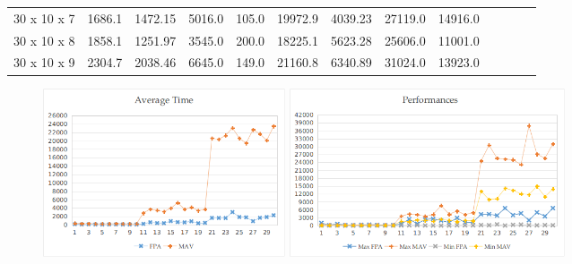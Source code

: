 \documentclass{article}
\begin{document}
\begin{table}[]
\begin{tabular}{ccccccccccccc}
	    		30     x 10   x 7   & 1686.1                       & 1472.15         & 5016.0                   & 105.0                    & 19972.9                      & 4039.23            & 27119.0                  & 14916.0                  \\
	    		30     x 10   x 8   & 1858.1                       & 1251.97           & 3545.0                   & 200.0                    & 18225.1                      & 5623.28            & 25606.0                  & 11001.0                  \\
	    		30     x 10   x 9   & 2304.7                       & 2038.46           & 6645.0                   & 149.0                    & 21160.8                      & 6340.89            & 31024.0                  & 13923.0                 
	    	\end{tabular}
	    \end{table}
	    
	    \begin{figure}
	    	\includegraphics[height=5cm]{reslin.png}
	     	\includegraphics[height=5cm]{reslinminmax.png}
	     \end{figure}
	     
\end{document}
